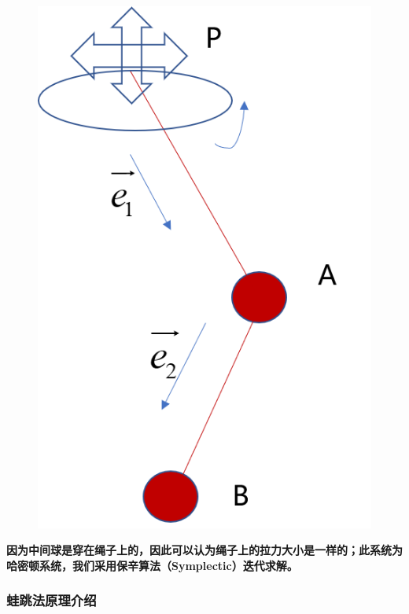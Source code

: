\documentclass[12pt,a4paper]{ctexart}
\begin{document}
		\begin{figure}[h] %
		\centering %
		\includegraphics[height=8\baselineskip]{T51.PNG} %
	\end{figure}%
	
	\noindent\textbf{因为中间球是穿在绳子上的，因此可以认为绳子上的拉力大小是一样的；此系统为哈密顿系统，我们采用保辛算法（Symplectic）迭代求解。}
	\clearpage
	\thispagestyle{empty}
	\subsubsection{蛙跳法原理介绍}
	\noindent\textbf{}
	
\end{document}
